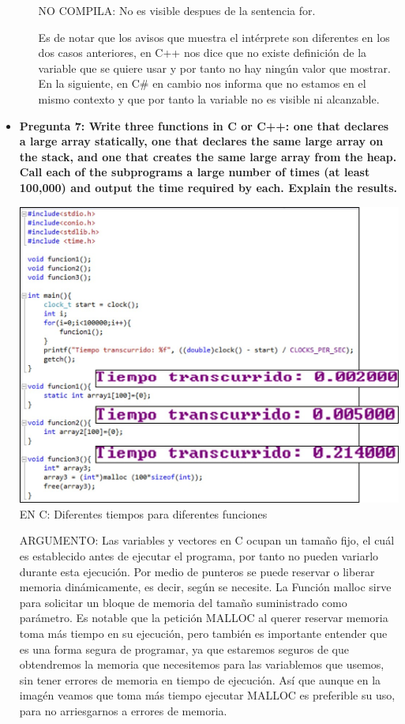 \documentclass[12pt,oneside]{article}
\begin{document}
\begin{itemize}
\begin{itemize}
\begin{center}
								NO COMPILA: No es visible despues de la sentencia for.
							\end{center}
							Es de notar que los avisos que muestra el intérprete son diferentes en los dos casos anteriores, en C++ nos dice que no existe definición de la variable que se quiere usar y por tanto no hay ningún valor que mostrar. En la 									siguiente, en C\# en cambio nos informa que no estamos en el mismo contexto y que por tanto la variable no es visible ni alcanzable.
					\end{itemize}
				\item {\bf Pregunta 7: Write three functions in C or C++: one that declares a large array statically, one that declares the same large array on the stack, and one that creates the same large array from the heap. Call each of the subprograms a large 					number of times (at least 100,000) and output the time required by each. Explain the results.}	
					\begin{center}
						\includegraphics[scale=0.6]{Imagenes/5.jpg}\\
						EN C: Diferentes tiempos para diferentes funciones
					\end{center}
					ARGUMENTO: Las variables y vectores en C ocupan un tamaño fijo, el cuál es establecido antes de ejecutar el programa, por tanto no pueden variarlo durante esta ejecución. Por medio de punteros se puede reservar o liberar memoria 							dinámicamente, es decir, según se necesite. La Función malloc sirve para solicitar un bloque de memoria del tamaño suministrado como parámetro.
					Es notable que la petición MALLOC al querer reservar memoria toma más tiempo en su ejecución, pero también es importante entender que es una forma segura de programar, ya que estaremos seguros de que obtendremos la memoria que 							necesitemos para las variablemos que usemos, sin tener errores de memoria en tiempo de ejecución.
					Así que aunque en la imagén veamos que toma más tiempo ejecutar MALLOC es preferible su uso, para no arriesgarnos a errores de memoria.
		\end{itemize}
\end{document}
